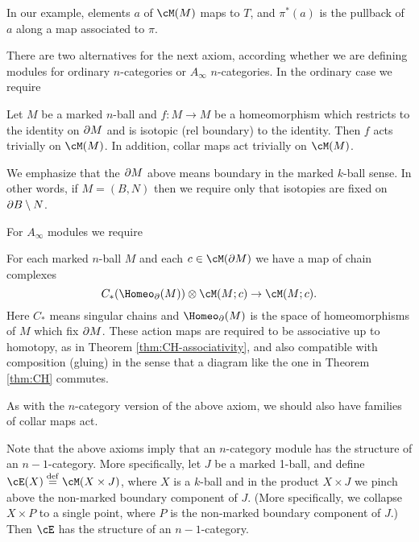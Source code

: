 In our example, elements $a$ of $\cM(M)$ maps to $T$, and $\pi^*(a)$ is the pullback of
$a$ along a map associated to $\pi$.

\medskip

There are two alternatives for the next axiom, according whether we are defining
modules for ordinary $n$-categories or $A_\infty$ $n$-categories.
In the ordinary case we require

\begin{module-axiom}
{Let $M$ be a marked $n$-ball and $f: M\to M$ be a homeomorphism which restricts
to the identity on $\partial M$ and is isotopic (rel boundary) to the identity.
Then $f$ acts trivially on $\cM(M)$.}
In addition, collar maps act trivially on $\cM(M)$.
\end{module-axiom}

We emphasize that the $\partial M$ above means boundary in the marked $k$-ball sense.
In other words, if $M = (B, N)$ then we require only that isotopies are fixed 
on $\partial B \setminus N$.

For $A_\infty$ modules we require

\begin{module-axiom}
For each marked $n$-ball $M$ and each $c\in \cM(\bd M)$ we have a map of chain complexes
\[
	C_*(\Homeo_\bd(M))\ot \cM(M; c) \to \cM(M; c) .
\]
Here $C_*$ means singular chains and $\Homeo_\bd(M)$ is the space of homeomorphisms of $M$
which fix $\partial M$.
These action maps are required to be associative up to homotopy, as in Theorem \ref{thm:CH-associativity}, 
and also compatible with composition (gluing) in the sense that
a diagram like the one in Theorem \ref{thm:CH} commutes.
\end{module-axiom}

As with the $n$-category version of the above axiom, we should also have families of collar maps act.

\medskip

Note that the above axioms imply that an $n$-category module has the structure
of an $n{-}1$-category.
More specifically, let $J$ be a marked 1-ball, and define $\cE(X)\deq \cM(X\times J)$,
where $X$ is a $k$-ball and in the product $X\times J$ we pinch 
above the non-marked boundary component of $J$.
(More specifically, we collapse $X\times P$ to a single point, where
$P$ is the non-marked boundary component of $J$.)
Then $\cE$ has the structure of an $n{-}1$-category.

